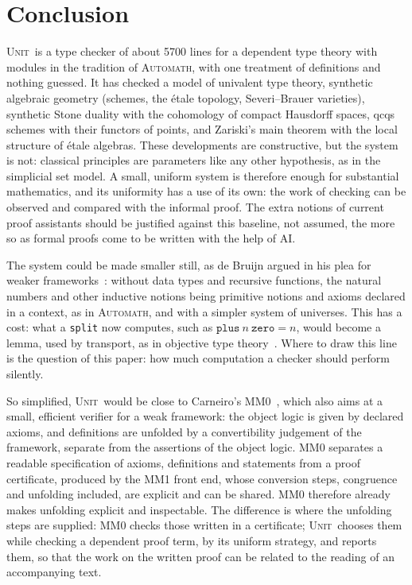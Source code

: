 \documentclass[11pt]{article}
\newcommand{\sys}{\textsc{Unit}}
\newcommand{\kw}[1]{\texttt{#1}}
\begin{document}
\section{Conclusion}

\sys\ is a type checker of about 5700 lines for a dependent type theory
with modules in the tradition of \textsc{Automath}, with one treatment of
definitions and nothing guessed. It has checked a model of univalent
type theory, synthetic algebraic geometry (schemes, the \'etale topology,
Severi--Brauer varieties),
synthetic Stone duality with the cohomology of compact Hausdorff
spaces, qcqs schemes with their functors of points, and Zariski's main
theorem with the local structure of \'etale algebras. These developments
are constructive, but the system is not: classical principles are
parameters like any other hypothesis, as in the simplicial set model.
A small, uniform system is therefore enough for substantial
mathematics, and its uniformity has a use of its own: the work of
checking can be observed and compared with the informal proof. The
extra notions of current proof assistants should be justified against
this baseline, not assumed, the more so as formal proofs come to be
written with the help of AI.

The system could be made smaller still, as de Bruijn argued in his plea
for weaker frameworks~\cite{Plea}: without data types and recursive
functions, the natural numbers and other inductive notions being
primitive notions and axioms declared in a context, as in
\textsc{Automath}, and with a simpler system of universes. This has a
cost: what a \kw{split} now computes, such as $\kw{plus}\ n\ \kw{zero} =
n$, would become a lemma, used by transport, as in objective type
theory~\cite{OTT}. Where to draw this line is the question of this
paper: how much computation a checker should perform silently.

So simplified, \sys\ would be close to Carneiro's MM0~\cite{MM0}, which
also aims at a small, efficient verifier for a weak framework: the
object logic is given by declared axioms, and definitions are unfolded
by a convertibility judgement of the framework, separate from the
assertions of the object logic. MM0 separates a readable specification
of axioms, definitions and statements from a proof certificate, produced
by the MM1 front end, whose conversion steps, congruence and unfolding
included, are explicit and can be shared. MM0 therefore already makes
unfolding explicit and inspectable. The difference is where the
unfolding steps are supplied: MM0 checks those written in a certificate;
\sys\ chooses them while checking a dependent proof term, by its uniform
strategy, and reports them, so that the work on the written proof can be
related to the reading of an accompanying text.
\end{document}
